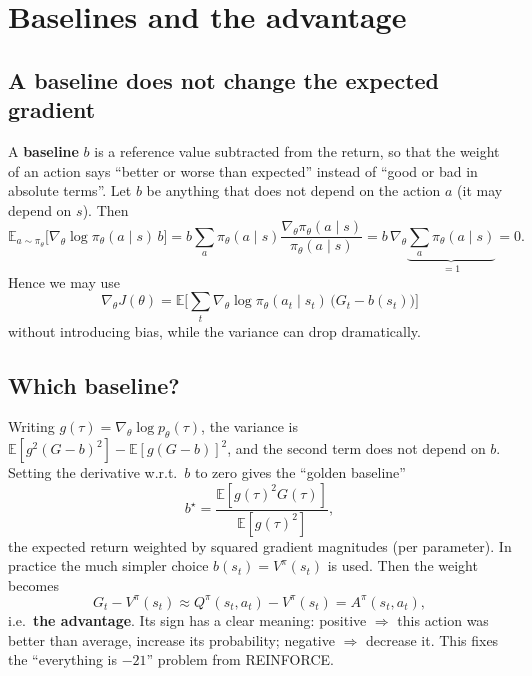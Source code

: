 \documentclass[11pt,a4paper]{article}
\newcommand{\E}{\mathbb{E}}
\newcommand{\pit}{\pi_\theta}
\newcommand{\gradt}{\nabla_\theta}
\begin{document}
\section{Baselines and the advantage}\label{sec:baseline}

\subsection{A baseline does not change the expected gradient}
A \textbf{baseline} $b$ is a reference value subtracted from the return, so that the weight of an action says \enquote{better or worse than expected} instead of \enquote{good or bad in absolute terms}.
Let $b$ be anything that does not depend on the action $a$ (it may depend on $s$). Then
\begin{equation}
  \E_{a\sim\pit}\big[\gradt\log\pit(a\mid s)\,b\big]
  = b\sum_a\pit(a\mid s)\frac{\gradt\pit(a\mid s)}{\pit(a\mid s)}
  = b\,\gradt\underbrace{\sum_a\pit(a\mid s)}_{=1} = 0 .
\end{equation}
Hence we may use
\begin{equation}
  \gradt J(\theta) = \E\Big[\sum_t\gradt\log\pit(a_t\mid s_t)\,\big(G_t - b(s_t)\big)\Big]
\end{equation}
without introducing bias, while the variance can drop dramatically.

\subsection{Which baseline?}
Writing $g(\tau)=\gradt\log p_\theta(\tau)$, the variance is $\E[g^2(G-b)^2]-\E[g(G-b)]^2$, and the second term does not depend on $b$. Setting the derivative w.r.t.\ $b$ to zero gives the \enquote{golden baseline}
\begin{equation}
  b^\star = \frac{\E[g(\tau)^2 G(\tau)]}{\E[g(\tau)^2]},
\end{equation}
the expected return weighted by squared gradient magnitudes (per parameter). In practice the much simpler choice $b(s_t)=V^\pi(s_t)$ is used. Then the weight becomes
\begin{equation}
  G_t - V^\pi(s_t) \approx Q^\pi(s_t,a_t)-V^\pi(s_t) = A^\pi(s_t,a_t),
\end{equation}
i.e.\ \textbf{the advantage}. Its sign has a clear meaning: positive $\Rightarrow$ this action was better than average, increase its probability; negative $\Rightarrow$ decrease it.
This fixes the \enquote{everything is $-21$} problem from REINFORCE.
\end{document}
